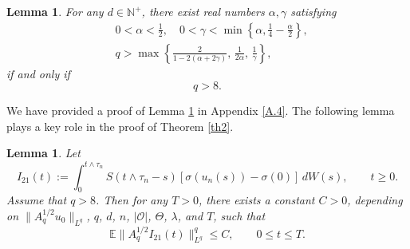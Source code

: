\documentclass[10pt]{article}
\numberwithin{figure}{section}
\numberwithin{equation}{section}
\newtheorem{lemma}[theorem]{Lemma}
\newcommand{\0}{{\theta}}
\def\be{\begin{equation}}
\def\ee{\end{equation}}
\def\a{\alpha}
\def\Vs{\vskip8pt}\def\vs{\vskip4pt}
\begin{document}
\begin{lemma}\label{le3.10}
For any $d\in\mathbb N^+$, there exist real numbers $\alpha,\gamma$ satisfying
\be\label{eq3.2}
\begin{aligned}
& 0 < \alpha < \frac{1}{2},\quad 0 < \gamma < \min\left\{\a,\frac{1}{4} - \frac{\alpha}{2}\right\}, \\
& q>\max\left\{\frac{2}{1-2(\alpha+2\gamma)},\,\frac{1}{2\a},\,\frac{1}{\gamma}\right\},
\end{aligned}
\ee
if and only if $$q>8.$$
\end{lemma}
We have provided a proof of Lemma \ref{le3.10} in Appendix \ref{A.4}.
\Vs
The following lemma plays a key role in the proof of Theorem \ref{th2}.
\begin{lemma}\label{le2.6} 
Let
$$
I_{21}(t):=\int_0^{t\wedge\tau_n}S(t\wedge\tau_n-s)[\sigma(u_n(s))-\sigma(0)]\,dW(s),\qquad t\ge0.
$$
Assume that $q>8$.
Then for any $T>0$, there exists a constant $C>0$, depending on $\|A_q^{1/2}u_0\|_{L^q}$, $q$, $d$, $n$, $|\mathcal O|$, $\Theta$, $\lambda$, and $T$, such that
$$
\mathbb{E}\|A_q^{1/2}I_{21}(t)\|_{L^q}^q \le C,\qquad 0\le t\le T.
$$
\end{lemma}
\end{document}
